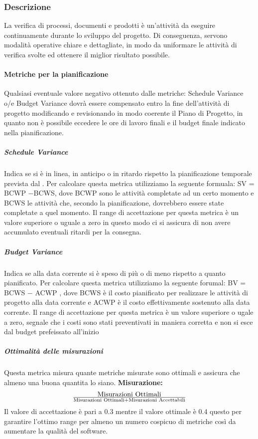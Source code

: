 \subsubsection{Descrizione}

La verifica di processi, documenti e prodotti è un’attività da eseguire continuamente
durante lo sviluppo del progetto. Di conseguenza, servono modalità operative chiare
e dettagliate, in modo da uniformare le attività di verifica svolte ed ottenere il miglior
risultato possibile.

\paragraph{Metriche per la pianificazione}
Qualsiasi eventuale valore negativo ottenuto dalle  metriche: Schedule Variance o/e Budget Variance dovrà essere  compensato entro la fine dell'attività di progetto modificando e revisionando in modo coerente il Piano di Progetto, in quanto non è possibile eccedere le ore di lavoro finali e il budget finale indicato nella pianificazione.

\subparagraph{Schedule Variance}
Indica se si è in linea, in anticipo o in ritardo rispetto la pianificazione temporale prevista dal \pianodiprogetto.
Per calcolare questa metrica utilizziamo la seguente formuala: SV = BCWP −BCWS, dove BCWP sono le attività completate ad un certo momento e BCWS
le attività che, secondo la pianificazione, dovrebbero essere state completate a quel momento.
Il range di accettazione per questa metrica è un valore superiore o uguale a zero in questo modo ci si assicura di non avere accumulato eventuali ritardi per la consegna.

\subparagraph{Budget Variance}
Indica se alla data corrente si è speso di più o di meno rispetto a quanto pianificato.
Per calcolare questa metrica utilizziamo la seguente forumal: BV = BCWS − ACWP , dove BCWS è il costo pianificato per realizzare le attività di progetto
alla data corrente e ACWP è il costo effettivamente sostenuto alla data corrente.
Il range di accettazione per questa metrica è un valore superiore o ugale a zero, segnale che i costi sono stati preventivati in maniera corretta e non si esce dal budget prefeissato all'inizio


\subparagraph{Ottimalità delle misurazioni}
Questa metrica misura quante metriche misurate sono ottimali e assicura che almeno una buona quantita lo siano.
\textbf{Misurazione:} 
\begin{displaymath}
{\text{Misurazioni Ottimali}}\over{\text{Misurazioni Ottimali} + \text{Misurazioni Accettabili}}
\end{displaymath} 
Il valore di accettazione è pari a 0.3 mentre il valore ottimale è 0.4 questo per garantire l'ottimo range per almeno un numero cospicuo di metriche così da aumentare la qualità del software.

